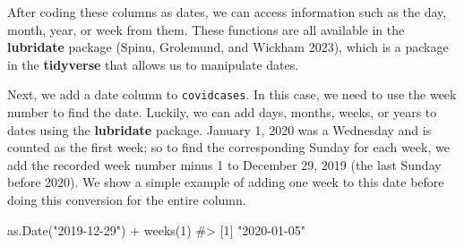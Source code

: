 \documentclass[
  letterpaper,
]{latex/krantz}
\makeatletter
\newenvironment{Shaded}{\begin{snugshade}}{\end{snugshade}}
\newcommand{\CommentTok}[1]{\textcolor[rgb]{0.37,0.37,0.37}{#1}}
\newcommand{\DecValTok}[1]{\textcolor[rgb]{0.68,0.00,0.00}{#1}}
\newcommand{\FunctionTok}[1]{\textcolor[rgb]{0.28,0.35,0.67}{#1}}
\newcommand{\NormalTok}[1]{\textcolor[rgb]{0.00,0.23,0.31}{#1}}
\newcommand{\SpecialCharTok}[1]{\textcolor[rgb]{0.37,0.37,0.37}{#1}}
\newcommand{\StringTok}[1]{\textcolor[rgb]{0.13,0.47,0.30}{#1}}
\newenvironment{kframe}{%
\medskip{}
\setlength{\fboxsep}{.8em}
 \def\at@end@of@kframe{}%
 \ifinner\ifhmode%
  \def\at@end@of@kframe{\end{minipage}}%
  \begin{minipage}{\columnwidth}%
 \fi\fi%
 \def\FrameCommand##1{\hskip\@totalleftmargin \hskip-\fboxsep
 \colorbox{shadecolor}{##1}\hskip-\fboxsep
     \hskip-\linewidth \hskip-\@totalleftmargin \hskip\columnwidth}%
 \MakeFramed {\advance\hsize-\width
   \@totalleftmargin\z@ \linewidth\hsize
   \@setminipage}}%
 {\par\unskip\endMakeFramed%
 \at@end@of@kframe}
\renewenvironment{Shaded}{\begin{kframe}}{\end{kframe}}
\makeatother
\begin{document}
After coding these columns as dates, we can access information such as
the day, month, year, or week from them. These functions are all
available in the \textbf{lubridate} package (Spinu, Grolemund, and
Wickham 2023), which is a package in the
\textbf{tidyverse} that allows us to manipulate dates.

\begin{Shaded}
\end{Shaded}

Next, we add a date column to \texttt{covidcases}. In this case, we need
to use the week number to find the date. Luckily, we can add days,
months, weeks, or years to dates using the
\textbf{lubridate} package. January 1, 2020
was a Wednesday and is counted as the first week; so to find the
corresponding Sunday for each week, we add the recorded week number
minus 1 to December 29, 2019 (the last Sunday before 2020). We show a
simple example of adding one week to this date before doing this
conversion for the entire column.

\begin{Shaded}
\begin{Highlighting}[]
\FunctionTok{as.Date}\NormalTok{(}\StringTok{"2019{-}12{-}29"}\NormalTok{) }\SpecialCharTok{+} \FunctionTok{weeks}\NormalTok{(}\DecValTok{1}\NormalTok{)}
\CommentTok{\#\textgreater{} [1] "2020{-}01{-}05"}
\end{Highlighting}
\end{Shaded}
\end{document}
